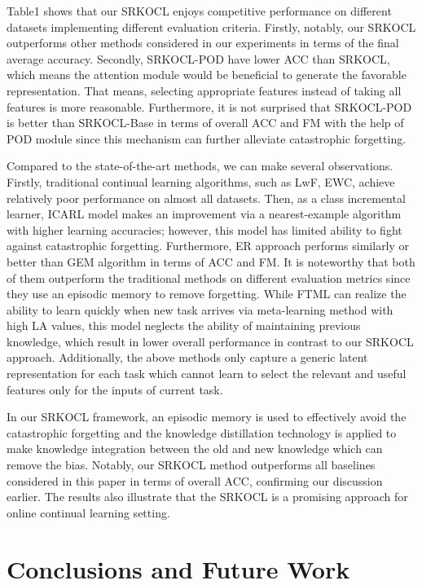 \documentclass[review]{elsarticle}
\begin{document}
Table1 shows that our SRKOCL enjoys competitive performance on different datasets implementing different evaluation criteria. Firstly, notably, our SRKOCL outperforms other methods considered in our experiments in terms of the final average accuracy. Secondly, SRKOCL-POD have lower ACC than SRKOCL, which means the attention module would be beneficial to generate the favorable representation. That means, selecting appropriate features instead of taking all features is more reasonable. Furthermore, it is not surprised that SRKOCL-POD is better than SRKOCL-Base in terms of overall ACC and FM with the help of POD module since this mechanism can further alleviate catastrophic forgetting.

Compared to the state-of-the-art methods, we can make several observations. Firstly, traditional continual learning algorithms, such as LwF, EWC, achieve relatively poor performance on almost all datasets. Then, as a class incremental learner, ICARL model makes an improvement via a nearest-example algorithm with higher learning accuracies; however, this model has limited ability to fight against catastrophic forgetting. Furthermore, ER approach performs similarly or better than GEM algorithm in terms of ACC and FM. It is noteworthy that both of them outperform the traditional methods on different evaluation metrics since they use an episodic memory to remove forgetting. While FTML can realize the ability to learn quickly when new task arrives via meta-learning method with high LA values, this model neglects the ability of maintaining previous knowledge, which result in lower overall performance in contrast to our SRKOCL approach. Additionally, the above methods only capture a generic latent representation for each task which cannot learn to select the relevant and useful features only for the inputs of current task.

In our SRKOCL framework, an episodic memory is used to effectively avoid the catastrophic forgetting and the knowledge distillation technology is applied to make knowledge integration between the old and new knowledge which can remove the bias. Notably, our SRKOCL method outperforms all baselines considered in this paper in terms of overall ACC, confirming our discussion earlier. The results also illustrate that the SRKOCL is a promising approach for online continual learning setting.

\section{Conclusions and Future Work}
\end{document}
